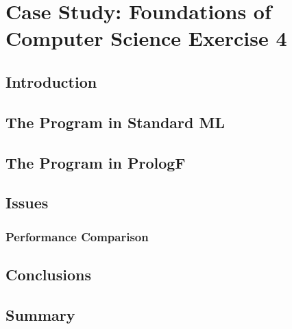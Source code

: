 \chapter{Case Study: Foundations of Computer Science Exercise 4}
\label{case_fcs}


\section{Introduction}

\section{The Program in Standard ML}

\section{The Program in PrologF}

\section{Issues}

\subsection{Performance Comparison}

\section{Conclusions}

\section{Summary}

